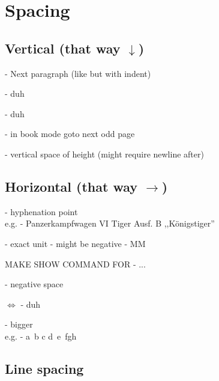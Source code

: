 \documentclass[11pt,a4paper]{article}
\begin{document}
{\section{Spacing}
\subsection[Vertical]{Vertical (that way $\downarrow$)}
\indent

\code{\par} - Next paragraph (like  \code{\\} but with indent)

\code{\newpage \pagebreak \clearpage} - duh

\code{\smallskip \medskip \bigskip } - duh

\code{\cleardoublepage} - in book mode goto next odd page

\code{\\[10cm] \vspace{10pt}} - vertical space of height (might require newline after)

\subsection[Horizontal]{Horizontal (that way $\rightarrow$)}
\indent

\code{\-} - hyphenation point\\
e.g.  - Panzer\-kampf\-wagen VI Tiger Ausf. B ,,Königs\-tiger''\smallskip

\code{\hspace{10pt}} - exact unit - might be negative
 - M\hspace{-9pt}M

MAKE SHOW COMMAND FOR  - ...



\code{\!} - negative space

\code{\thinspace \medspace \thickspace} $\iff$ \code{\, \: \;} - duh

\code{~ \ \quad \qquad} - bigger\\
e.g.  - 
a\, b\: c\; d~e\ f\quad g\qquad h

\subsection{Line spacing}
\begin{latex}
\linespread{1.3} %
\linespread{1.6} %
\end{latex}


}
\end{document}
